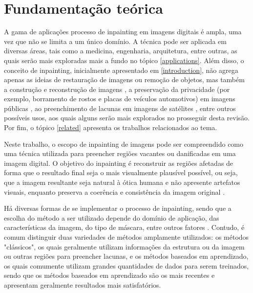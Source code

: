 
\section{Fundamentação teórica}

A gama de aplicações processo de inpainting em imagens digitais é ampla, uma vez que não se limita a um único domínio. A técnica pode ser aplicada em diversas áreas, tais como a medicina, engenharia, arquitetura, entre outras, as quais serão mais exploradas mais a fundo no tópico \ref{applications}.
Além disso, o conceito de inpainting, inicialmente apresentado em \ref{introduction}, não agrega apenas as ideias de restauração de imagens ou remoção de objetos, mas também a construção e reconstrução de imagens \cite{you2019pirec}, a preservação da privacidade (por exemplo, borramento de rostos e placas de veículos automotivos) em imagens públicas \cite{google2022magritte}, ao preenchimento de lacunas em imagens de satélites \cite{Maalouf2009bandelet}, entre outros possíveis usos, aos quais alguns serão mais explorados no prosseguir desta revisão. Por fim, o tópico \ref{related} apresenta os trabalhos relacionados ao tema. 

Neste trabalho, o escopo de inpainting de imagens pode ser compreendido como uma técnica utilizada para preencher regiões vacantes ou danificadas em uma imagem digital. O objetivo do inpainting é reconstruir as regiões afetadas de forma que o resultado final seja o mais visualmente plausível possível, ou seja, que a imagem resultante seja natural à ótica humana e não apresente artefatos visuais, enquanto preserva a coerência e consistência da imagem original \cite{levin2003learning}.

Há diversas formas de se implementar o processo de inpainting, sendo que a escolha do método a ser utilizado depende do domínio de aplicação, das características da imagem, do tipo de máscara, entre outros fatores \cite{black2020evaluation}. Contudo, é comum distinguir duas variedades de métodos amplamente utilizados: os métodos "clássicos", os quais geralmente utilizam informações da estrutura ou da imagem ou outras regiões para preencher lacunas, e os métodos baseados em aprendizado, os quais comumente utilizam grandes quantidades de dados para serem treinados, sendo que os métodos baseados em aprendizado são os mais recentes e apresentam geralmente resultados mais satisfatórios.


